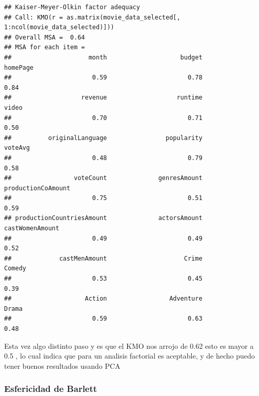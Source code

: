 \documentclass[
]{article}
\newenvironment{Shaded}{\begin{snugshade}}{\end{snugshade}}
\newcommand{\AttributeTok}[1]{\textcolor[rgb]{0.13,0.29,0.53}{#1}}
\newcommand{\CommentTok}[1]{\textcolor[rgb]{0.56,0.35,0.01}{\textit{#1}}}
\newcommand{\DecValTok}[1]{\textcolor[rgb]{0.00,0.00,0.81}{#1}}
\newcommand{\FunctionTok}[1]{\textcolor[rgb]{0.13,0.29,0.53}{\textbf{#1}}}
\newcommand{\NormalTok}[1]{#1}
\newcommand{\OtherTok}[1]{\textcolor[rgb]{0.56,0.35,0.01}{#1}}
\newcommand{\SpecialCharTok}[1]{\textcolor[rgb]{0.81,0.36,0.00}{\textbf{#1}}}
\newcommand{\StringTok}[1]{\textcolor[rgb]{0.31,0.60,0.02}{#1}}
\begin{document}
\begin{verbatim}
## Kaiser-Meyer-Olkin factor adequacy
## Call: KMO(r = as.matrix(movie_data_selected[, 1:ncol(movie_data_selected)]))
## Overall MSA =  0.64
## MSA for each item = 
##                     month                    budget                  homePage 
##                      0.59                      0.78                      0.84 
##                   revenue                   runtime                     video 
##                      0.70                      0.71                      0.50 
##          originalLanguage                popularity                   voteAvg 
##                      0.48                      0.79                      0.58 
##                 voteCount              genresAmount        productionCoAmount 
##                      0.75                      0.51                      0.59 
## productionCountriesAmount              actorsAmount           castWomenAmount 
##                      0.49                      0.49                      0.52 
##             castMenAmount                     Crime                    Comedy 
##                      0.53                      0.45                      0.39 
##                    Action                 Adventure                     Drama 
##                      0.59                      0.63                      0.48
\end{verbatim}

Esta vez algo distinto paso y es que el KMO nos arrojo de 0.62 esto es
mayor a 0.5 , lo cual indica que para un analisis factorial es
aceptable, y de hecho puedo tener buenos resultados usando PCA

\subsubsection{Esfericidad de Barlett}\label{esfericidad-de-barlett}

\begin{Shaded}
\end{Shaded}
\end{document}
